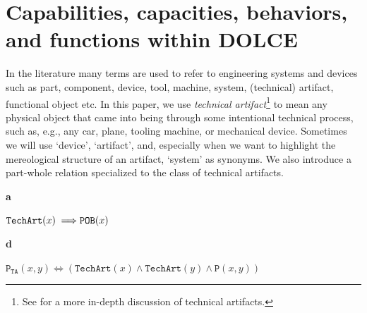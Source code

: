 \documentclass[sw]{iosart2x}
\newcommand{\bflist}{\begin{list}{}{\setlength{\topsep}{2mm}\setlength{\partopsep}{0mm}\setlength{\parsep}{0mm}\setlength{\leftmargin}{9mm}\setlength{\labelwidth}{8mm}}}
\newcommand{\eflist}{\end{list}}
\newcommand{\AxLabel}{\textrm{a}}
\newcommand{\DefLabel}{\textrm{d}}
\newcounter{cntax}
\newcommand{\myax}[1]{\refstepcounter{cntax}\begin{small}{\bf \AxLabel\thecntax\label{ax:#1}}\end{small}}
\newcounter{cntdef}
\newcommand{\mydf}[1]{\refstepcounter{cntdef}\begin{small}{\bf \DefLabel\thecntdef\label{def:#1}}\end{small}}
\newcommand{\generalStyle}[1]{\texttt{#1}}
\newcommand{\biRel}[3]{\generalStyle{#1}(#2,#3)}
\newcommand{\uniRel}[2]{\generalStyle{#1}(#2)}
\newcommand{\biRelPar}[4]{\generalStyle{#1}_{\generalStyle{#4}}(#2,#3)}
\newcommand{\myiff}{\Longleftrightarrow}
\newcommand{\myfi}{\hspace{0.9mm} \Longrightarrow}
\newcommand{\DOLCE}{\textsc{DOLCE}\xspace} %
\newcommand{\DOLCEPhysObj}[1]{\uniRel{{POB}}{#1}}
\newcommand{\DOLCEPart}[2]{\biRel{{P}}{#1}{#2}}
\newcommand{\TechArt}[1]{\uniRel{TechArt}{#1}}
\newcommand{\Component}[1]{\uniRel{Component}{#1}}
\newcommand{\partTA}[2]{\biRelPar{P}{#1}{#2}{TA}}
\newcommand{\firstTimeKeyWord}[1]{\textit{#1}}
\newcommand{\quotes}[1]{`#1'}
\newcommand{\TODO}[1]{{\color{red} #1}}
\newcommand{\TODOinline}[1]{{\color{red} #1}}
\begin{document}
\section{Capabilities, capacities, behaviors, and functions within \DOLCE \label{sec:capabilitiesEtc}}
In the literature many terms are used to refer to engineering systems and devices such as part, component, device, tool, machine, system, (technical) artifact, functional object etc. 
In this paper, we use \firstTimeKeyWord{technical artifact}\footnote{See \cite{borgoTechnicalArtifactsIntegrated2017} for a more in-depth discussion of technical artifacts.} to mean any physical object that came into being through some intentional technical process, such as, e.g., any car, plane, tooling machine, or mechanical device. Sometimes we will use \quotes{device}, \quotes{artifact}, and,  especially when we want to highlight the mereological structure of an artifact, \quotes{system} as synonyms.
We also introduce a part-whole relation specialized to the class of technical artifacts.
\bflist
\item[\myax{subsumptionTArt}] $ \TechArt{x} \myfi \DOLCEPhysObj{x}$%
\item[\mydf{partTA}] $ \partTA{x}{y} \myiff (\TechArt{x} \land \TechArt{y} \land  \DOLCEPart{x}{y})  $%
\eflist
\end{document}
